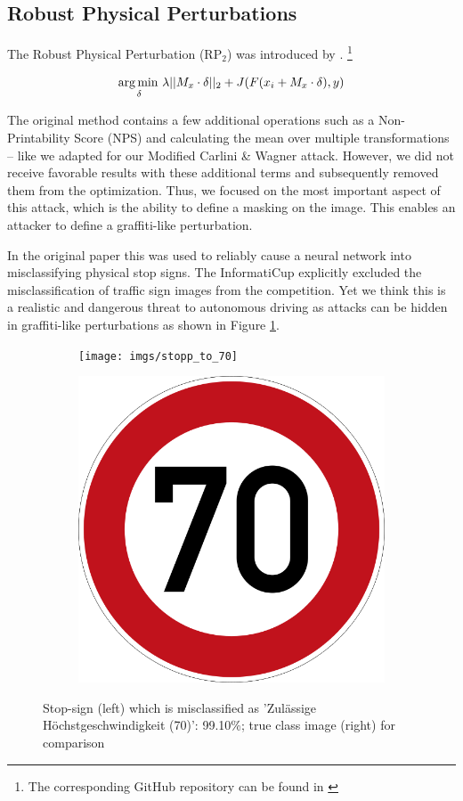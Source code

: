 \subsection{Robust Physical Perturbations}

The Robust Physical Perturbation (RP$_2$) was introduced by \citet{eykholt2018robust}.
\footnote{The corresponding GitHub repository can be found in \cite{rp2repo}}

\begin{equation}
\operatorname*{arg\,min\,}_\delta \lambda ||M_x \cdot \delta||_2 + J(F(x_i + M_x \cdot \delta), y)
\end{equation}

The original method contains a few additional operations such as a Non-Printability Score (NPS) and calculating the mean over multiple transformations -- like we adapted for our Modified Carlini \& Wagner attack.
However, we did not receive favorable results with these additional terms and subsequently removed them from the optimization.
Thus, we focused on the most important aspect of this attack,
which is the ability to define a masking on the image.
This enables an attacker to define a graffiti-like perturbation.

In the original paper this was used to reliably cause a neural network into misclassifying physical stop signs.
The InformatiCup explicitly excluded the misclassification of traffic sign images from the competition.
Yet we think this is a realistic and dangerous threat to autonomous driving as attacks can be hidden in graffiti-like perturbations as shown in Figure \ref{fig:stopsign}.

\begin{figure}[h]
\centering
\begin{subfigure}{.19\linewidth}
  \centering
  \texttt{[image: imgs/stopp\_to\_70]}
\end{subfigure}
\begin{subfigure}{.19\linewidth}
  \centering
  \includegraphics[width=0.7\linewidth]{imgs/7_real}
\end{subfigure}
\caption{Stop-sign (left) which is misclassified as 'Zulässige Höchstgeschwindigkeit (70)': 99.10\%; true class image (right) for comparison}
\label{fig:stopsign}
\end{figure}
